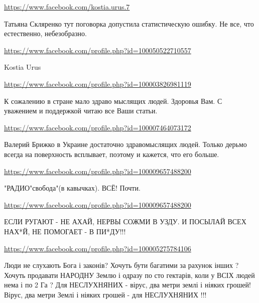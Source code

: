 \documentclass[a4paper,11pt]{extreport}
\begin{document}
\begin{itemize}
\begin{itemize}
\url{https://www.facebook.com/kostia.urus.7}

Татьяна Скляренко тут поговорка допустила статистическую ошибку. Не все, что естественно, небезобразно.

\url{https://www.facebook.com/profile.php?id=100050522710557}

Kostia Urus

\end{itemize}
\url{https://www.facebook.com/profile.php?id=100003826981119}

К сожалению в стране мало здраво мыслящих людей. Здоровья Вам. С уважением и поддержкой читаю все Ваши статьи.

\begin{itemize}
\url{https://www.facebook.com/profile.php?id=100007464073172}

Валерий Брижко в Украине достаточно здравомыслящих людей. Только дерьмо всегда на поверхность всплывает, поэтому и кажется, что его больше.

\end{itemize}
\url{https://www.facebook.com/profile.php?id=100009657488200}

"РАДИО"свобода"(в кавычках). ВСЁ! Почти.

\url{https://www.facebook.com/profile.php?id=100009657488200}

ЕСЛИ РУГАЮТ - НЕ АХАЙ,
НЕРВЫ СОЖМИ В УЗДУ.
И ПОСЫЛАЙ ВСЕХ НАХ*Й,
НЕ ПОМОГАЕТ - В ПИ*ДУ!!!

\url{https://www.facebook.com/profile.php?id=100005275784106}

Люди не слухають Бога і законів? Хочуть бути багатими за рахунок інших ? Хочуть продавати НАРОДНУ Землю і одразу по сто гектарів, коли у ВСІХ людей нема і по 2 Га ? Для НЕСЛУХНЯНИХ - вірус, два метри землі і ніяких грошей! Вірус, два метри Землі і ніяких грошей - для НЕСЛУХНЯНИХ !!!


\end{itemize}
\end{document}
